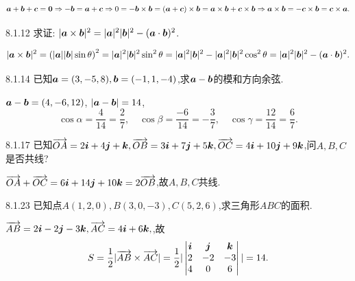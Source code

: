 \begin{solution}
    $$\bm{a} + \bm{b} + \bm{c} = \mathbf{0} \Rightarrow - \bm{b} = \bm{a} + \bm{c} \Rightarrow 0 = - \bm{b} \times \bm{b} = (\bm{a} + \bm{c}) \times \bm{b} = \bm{a} \times \bm{b} + \bm{c} \times \bm{b} \Rightarrow \bm{a} \times \bm{b} = - \bm{c} \times \bm{b} = \bm{c} \times \bm{a}.$$
\end{solution}

\begin{exercise}{8.1.12}
    求证: $|\bm{a} \times \bm{b} |^2 = |\bm{a}|^2|\bm{b}|^2 - (\bm{a} \cdot \bm{b})^2$.
\end{exercise}

\begin{solution}
    $$
    |\bm{a} \times \bm{b}|^2 = \left( |\bm{a}||\bm{b}| \sin \theta \right)^2 = |\bm{a}|^2|\bm{b}|^2\sin^2\theta = |\bm{a}|^2|\bm{b}|^2 - |\bm{a}|^2|\bm{b}|^2\cos^2\theta = |\bm{a}|^2|\bm{b}|^2 - (\bm{a} \cdot \bm{b})^2.
    $$
\end{solution}

\begin{exercise}{8.1.14}
    已知$\bm{a} = (3,-5,8), \bm{b} = (-1,1,-4)$,求$\bm{a} - \bm{b}$的模和方向余弦.
\end{exercise}

\begin{solution}
    $\bm{a} - \bm{b} = (4,-6,12)$, $|\bm{a} - \bm{b}| = 14$,
    $$
    \cos \alpha = \frac{4}{14} = \frac{2}{7}, \quad  \cos \beta = \frac{-6}{14} = -\frac{3}{7}, \quad \cos \gamma = \frac{12}{14} = \frac{6}{7}.
    $$
\end{solution}

\begin{example}{8.1.17}
    已知$\overrightarrow{OA} = 2 \bm{i} +4\bm{j} + \bm{k}, \overrightarrow{OB} = 3\bm{i} + 7\bm{j} + 5\bm{k}, \overrightarrow{OC} = 4\bm{i} + 10\bm{j} + 9\bm{k}$,问$A,B,C$是否共线?
\end{example}

\begin{solution}
    $\overrightarrow{OA} + \overrightarrow{OC} = 6 \bm{i} + 14 \bm{j} + 10 \bm{k} = 2\overrightarrow{OB}$,故$A,B,C$共线.
\end{solution}

\begin{exercise}{8.1.23}
    已知点$A(1,2,0),B(3,0,-3),C(5,2,6)$,求三角形$ABC$的面积.
\end{exercise}

\begin{solution}
    $\overrightarrow{AB} = 2\bm{i} - 2\bm{j} - 3\bm{k}, \overrightarrow{AC} = 4\bm{i} + 6 \bm{k},$,故
    $$
    S = \frac{1}{2}|\overrightarrow{AB} \times \overrightarrow{AC}| = \frac{1}{2}|\begin{vmatrix}
        \bm{i} & \bm{j} & \bm{k} \\
        2 & -2 & -3 \\
        4 & 0 & 6
    \end{vmatrix}| = 14.
    $$
\end{solution}

